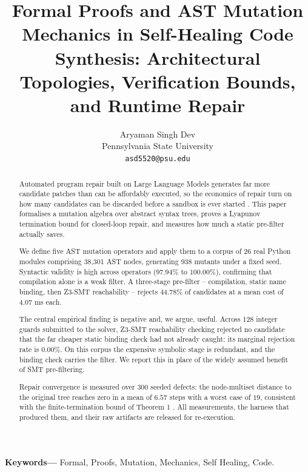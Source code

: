 \documentclass[10pt,twocolumn,letterpaper]{article}
\begin{document}
\title{Formal Proofs and AST Mutation Mechanics in Self-Healing Code Synthesis: Architectural Topologies, Verification Bounds, and Runtime Repair}

\author{
Aryaman Singh Dev\\
Pennsylvania State University \\
\texttt{asd5520@psu.edu}
}

\maketitle

\begin{abstract}
Automated program repair built on Large Language Models generates far more candidate patches than can be affordably executed, so the economics of repair turn on how many candidates can be discarded before a sandbox is ever started \cite{arxiv_2405_01543,arxiv_2010_11146}. This paper formalises a mutation algebra over abstract syntax trees, proves a Lyapunov termination bound for closed-loop repair, and measures how much a static pre-filter actually saves.

We define five AST mutation operators and apply them to a corpus of 26 real Python modules comprising 38{,}301 AST nodes, generating 938 mutants under a fixed seed. Syntactic validity is high across operators ($97.94\%$ to $100.00\%$), confirming that compilation alone is a weak filter. A three-stage pre-filter -- compilation, static name binding, then Z3-SMT reachability -- rejects $44.78\%$ of candidates at a mean cost of $4.07$ ms each.

The central empirical finding is negative and, we argue, useful. Across 128 integer guards submitted to the solver, Z3-SMT reachability checking rejected no candidate that the far cheaper static binding check had not already caught: its marginal rejection rate is $0.00\%$. On this corpus the expensive symbolic stage is redundant, and the binding check carries the filter. We report this in place of the widely assumed benefit of SMT pre-filtering.

Repair convergence is measured over 300 seeded defects: the node-multiset distance to the original tree reaches zero in a mean of $6.57$ steps with a worst case of $19$, consistent with the finite-termination bound of Theorem 1 \cite{arxiv_2501_02497}. All measurements, the harness that produced them, and their raw artifacts are released for re-execution.
\end{abstract}

\noindent\textbf{Keywords---} Formal, Proofs, Mutation, Mechanics, Self Healing, Code.
\end{document}
